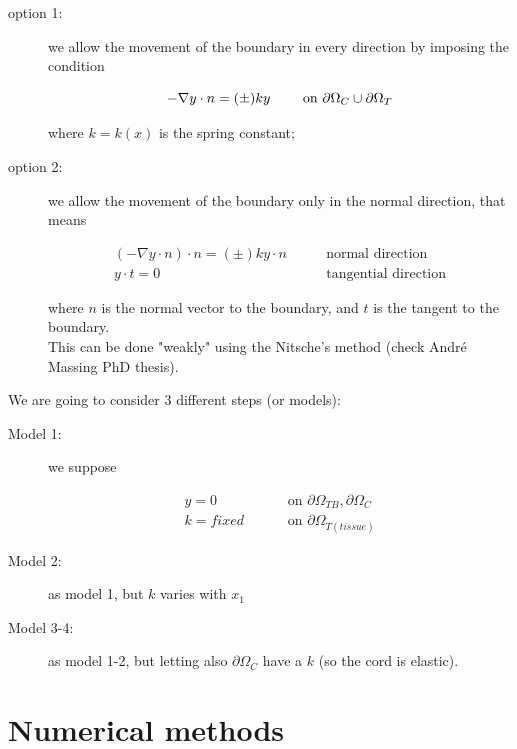 \documentclass[11pt,a4paper,titlepage]{report}
\begin{document}
\begin{description}
\item[option 1:] we allow the movement of the boundary in every direction by imposing the condition

\[
- \nabla y \cdot n = (\pm)ky \qquad \text{ on } \partial \Omega_C \cup \partial \Omega_T \\
\]

where $k = k(x)$ is the spring constant;

\item[option 2:] we allow the movement of the boundary only in the normal direction, that means

\[
\begin{aligned}
(- \nabla y \cdot n) \cdot n = (\pm)ky \cdot n & \qquad \text{normal direction} \\
y \cdot t = 0 & \qquad \text{tangential direction}
\end{aligned}
\]

where $n$ is the normal vector to the boundary, and $t$ is the tangent to the boundary. \\
This can be done "weakly" using the Nitsche's method (check André Massing PhD thesis).

\end{description}

We are going to consider 3 different steps (or models):

\begin{description}
\item[Model 1:] we suppose

\[
\begin{aligned}
y = 0 & \qquad \text{ on } \partial \Omega_{TB}, \partial \Omega_C \\
k = fixed & \qquad \text{ on } \partial \Omega_{T (tissue)}
\end{aligned}
\]

\item[Model 2:] as model 1, but $k$ varies with $x_1$
\item[Model 3-4:] as model 1-2, but letting also $\partial \Omega_C$ have a $k$ (so the cord is elastic).

\end{description}





\chapter{Numerical methods}
\end{document}
